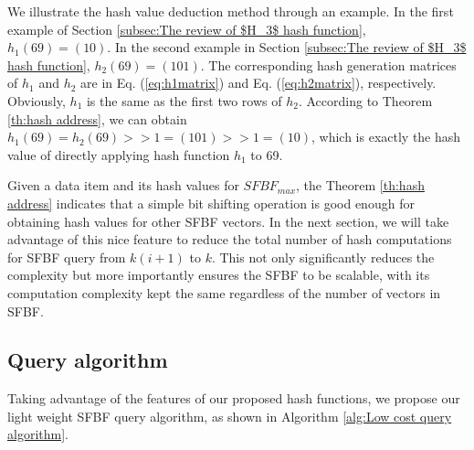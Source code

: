 \documentclass[10pt,journal,compsoc]{IEEEtran}
\begin{document}
We illustrate the hash value deduction method through an example. In the first example of Section \ref{subsec:The review of $H_3$ hash function}, $h_1(69)=(10)$. In the second example in Section \ref{subsec:The review of $H_3$ hash function}, $h_2(69)=(101)$. The corresponding hash generation matrices of $h_1$ and $h_2$ are in Eq. (\ref{eq:h1matrix}) and Eq. (\ref{eq:h2matrix}), respectively. Obviously, $h_1$ is the same as the first two rows of $h_2$. According to Theorem \ref{th:hash address}, we can obtain $h_1(69)=h_2(69)>>1=(101)>>1=(10)$, which is exactly the hash value of directly applying hash function $h_1$ to 69.

Given a data item and its hash values for $SFBF_{max}$, the Theorem \ref{th:hash address} indicates that a simple
bit shifting operation is good enough for obtaining hash values for other SFBF vectors.
In the next section, we will take advantage of this nice feature  to reduce the total number of hash computations for SFBF query from $k(i+1)$ to $k$. This not only significantly reduces the complexity but more importantly ensures the SFBF to be scalable, with its computation complexity kept the same regardless of the number of vectors in SFBF.
\subsection{Query algorithm}
%

Taking advantage of the features of our proposed hash
functions, we propose our light weight SFBF query algorithm, as shown in Algorithm \ref{alg:Low cost query algorithm}.
\end{document}
